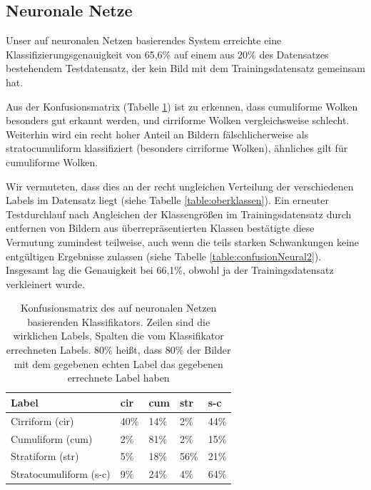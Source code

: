 \documentclass[a4,german]{article}
\begin{document}
\subsection{Neuronale Netze}

Unser auf neuronalen Netzen basierendes System erreichte eine Klassifizierungsgenauigkeit von 65,6\% auf einem aus 20\% des Datensatzes bestehendem Testdatensatz, der kein Bild mit dem Trainingsdatensatz gemeinsam hat.

Aus der Konfusionsmatrix (Tabelle \ref{tab:confusionNeural}) ist zu erkennen, dass cumuliforme Wolken besonders gut erkannt werden, und cirriforme Wolken vergleichsweise schlecht.
Weiterhin wird ein recht hoher Anteil an Bildern fälschlicherweise als stratocumuliform klassifiziert (besonders cirriforme Wolken), ähnliches gilt für cumuliforme Wolken.

Wir vermuteten, dass dies an der recht ungleichen Verteilung der verschiedenen Labels im Datensatz liegt (siehe Tabelle \ref{table:oberklassen}).
Ein erneuter Testdurchlauf nach Angleichen der Klassengrößen im Trainingsdatensatz durch entfernen von Bildern aus überrepräsentierten Klassen bestätigte diese Vermutung zumindest teilweise, auch wenn die teils starken Schwankungen keine entgültigen Ergebnisse zulassen (siehe Tabelle \ref{table:confusionNeural2}).
Insgesamt lag die Genauigkeit bei 66,1\%, obwohl ja der Trainingsdatensatz verkleinert wurde.


\begin{table}
    \centering
    \begin{tabular}{| l | l | l | l | l |}
        \hline
        Label & cir & cum & str & s-c \\ \hline
        Cirriform (cir) & 40\% & 14\% & 2\% & 44\% \\ \hline
        Cumuliform (cum) & 2\% & 81\% & 2\% & 15\% \\ \hline
        Stratiform (str) & 5\% & 18\% & 56\% & 21\% \\ \hline
        Stratocumuliform (s-c) & 9\% & 24\% & 4\% & 64\% \\ \hline
    \end{tabular}
    \caption{Konfusionsmatrix des auf neuronalen Netzen basierenden Klassifikators. Zeilen sind die wirklichen Labels, Spalten die vom Klassifikator errechneten Labels. 80\% heißt, dass 80\% der Bilder mit dem gegebenen echten Label das gegebenen errechnete Label haben}
    \label{tab:confusionNeural}
\end{table}
\end{document}
